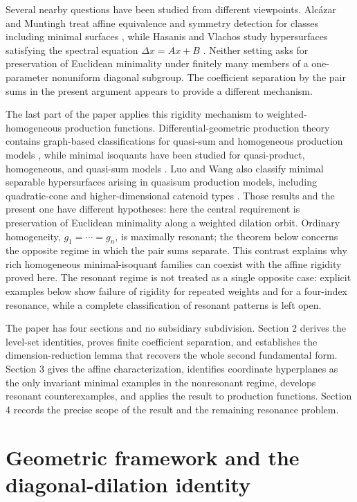 \documentclass[preprint,12pt]{elsarticle}
\numberwithin{equation}{section}
\theoremstyle{definition}\newtheorem{definition}[theorem]{Definition}
\theoremstyle{remark}\newtheorem{remark}[theorem]{Remark}
\begin{document}
Several nearby questions have been studied from different viewpoints. Alc\'azar and Muntingh treat affine equivalence and symmetry detection for classes including minimal surfaces \cite{AlcazarMuntingh2022}, while Hasanis and Vlachos study hypersurfaces satisfying the spectral equation $\Delta x=Ax+B$ \cite{HasanisVlachos1992}. Neither setting asks for preservation of Euclidean minimality under finitely many members of a one-parameter nonuniform diagonal subgroup. The coefficient separation by the pair sums in the present argument appears to provide a different mechanism.

The last part of the paper applies this rigidity mechanism to weighted-homogeneous production functions. Differential-geometric production theory contains graph-based classifications for quasi-sum and homogeneous production models \cite{Chen2012QuasiSum,ChenVilcu2013}, while minimal isoquants have been studied for quasi-product, homogeneous, and quasi-sum models \cite{NeacsuEtAl2024,FuLuo2025}. Luo and Wang also classify minimal separable hypersurfaces arising in quasisum production models, including quadratic-cone and higher-dimensional catenoid types \cite{LuoWang2025}. Those results and the present one have different hypotheses: here the central requirement is preservation of Euclidean minimality along a weighted dilation orbit. Ordinary homogeneity, $g_1=\cdots=g_n$, is maximally resonant; the theorem below concerns the opposite regime in which the pair sums separate. This contrast explains why rich homogeneous minimal-isoquant families can coexist with the affine rigidity proved here. The resonant regime is not treated as a single opposite case: explicit examples below show failure of rigidity for repeated weights and for a four-index resonance, while a complete classification of resonant patterns is left open.

The paper has four sections and no subsidiary subdivision. Section 2 derives the level-set identities, proves finite coefficient separation, and establishes the dimension-reduction lemma that recovers the whole second fundamental form. Section 3 gives the affine characterization, identifies coordinate hyperplanes as the only invariant minimal examples in the nonresonant regime, develops resonant counterexamples, and applies the result to production functions. Section 4 records the precise scope of the result and the remaining resonance problem.

\section{Geometric framework and the diagonal-dilation identity}\label{sec:geometry}
\end{document}
